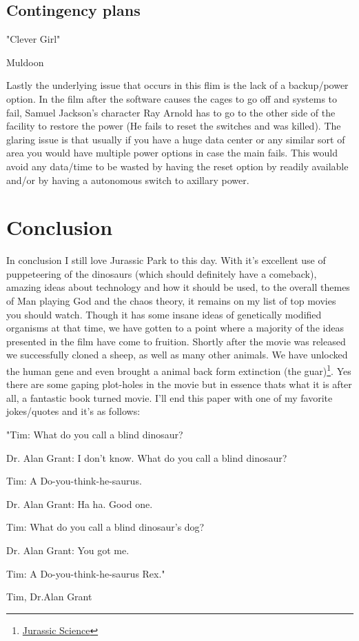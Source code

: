 \documentclass[12ptletterpaper]{paper}
\newcommand\tab[1][1cm]{\hspace*{#1}}
\begin{document}
\begin{flushleft}
		\subsection{Contingency plans}
		\epigraph{"Clever Girl"}{Muldoon}
		\tab Lastly the underlying issue that occurs in this flim is the lack of a backup/power option. In the film after the software causes the cages to go off and systems to fail, Samuel Jackson's character Ray Arnold has to go to the other side of the facility to restore the power (He fails to reset the switches and was killed). The glaring issue is that usually if you have a huge data center or any similar sort of area you would have multiple power options in case the main fails. This would avoid any data/time to be wasted by having the reset option by readily available and/or by having a autonomous switch to axillary power.
		\section{Conclusion}
		\tab In conclusion I still love Jurassic Park to this day. With it's excellent use of puppeteering of the dinosaurs (which should definitely have a comeback), amazing ideas about technology and how it should be used, to the overall themes of Man playing God and the chaos theory, it remains on my list of top movies you should watch. Though it has some insane ideas of genetically modified organisms at that time, we have gotten to a point where a majority of the ideas presented in the film have come to fruition. Shortly after the movie was released we successfully cloned a sheep, as well as many other animals. We have unlocked the human gene and even brought a animal back form extinction (the guar)\footnote[10]{\hyperlink{Jurassic Science}{Jurassic Science}}. Yes there are some gaping plot-holes in the movie but in essence thats what it is after all, a fantastic book turned movie. I'll end this paper with one of my favorite jokes/quotes and it's as follows:\epigraph{"Tim: What do you call a blind dinosaur?
			
			Dr. Alan Grant: I don't know. What do you call a blind dinosaur?
			
			Tim: A Do-you-think-he-saurus.
			
			Dr. Alan Grant: Ha ha. Good one.
			
			Tim: What do you call a blind dinosaur's dog?
			
			Dr. Alan Grant: You got me.
			
			Tim: A Do-you-think-he-saurus Rex."}{Tim, Dr.Alan Grant}
		\pagebreak

\end{flushleft}
\end{document}
